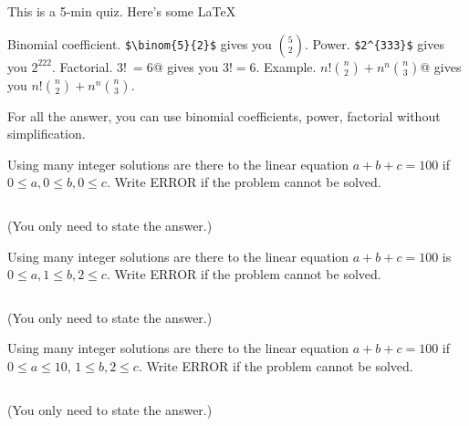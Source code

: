 

\renewcommand\AUTHOR{nweadick1@cougars.ccis.edu} %


\topmattertwo

This is a 5-min quiz.
Here's some \LaTeX\:
\begin{enumerate}[nosep]
\li Binomial coefficient. \verb!$\binom{5}{2}$! gives you $\binom{5}{2}$.
\li Power. \verb!$2^{333}$! gives you $2^{222}$.
\li Factorial. \verb@$3!\ = 6$@ gives you $3! = 6$.
\li Example. \verb@$n!\binom{n}{2} + n^n\binom{n}{3}$@
gives you $n!\binom{n}{2} + n^n\binom{n}{3}$.
\end{enumerate}
For all the answer, you can use binomial coefficients, power, factorial
without simplification.

\nextq
Using many integer solutions are there to the linear equation
$a + b + c = 100$ if $0 \leq a, 0 \leq b, 0 \leq c$.
Write ERROR if the problem cannot be solved.
\\
\ANSWER
\begin{answerlong}
$ $
\end{answerlong}
(You only need to state the answer.)

\nextq
Using many integer solutions are there to the linear equation
$a + b + c = 100$
is $0 \leq a, 1 \leq b, 2 \leq c$.
Write ERROR if the problem cannot be solved.
\\
\ANSWER
\begin{answerlong}
$ $
\end{answerlong}
(You only need to state the answer.)

\nextq
Using many integer solutions are there to the linear equation
$a + b + c = 100$
if $0 \leq a \leq 10$, $1 \leq b, 2 \leq c$.
Write ERROR if the problem cannot be solved.
\\
\ANSWER
\begin{answerlong}
$ $
\end{answerlong}
(You only need to state the answer.)


\newpage


